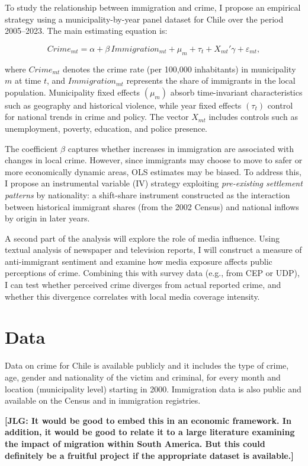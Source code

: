 To study the relationship between immigration and crime, I propose an empirical strategy using a municipality-by-year panel dataset for Chile over the period 2005--2023. The main estimating equation is:

\begin{equation}
	Crime_{mt} = \alpha + \beta \, Immigration_{mt} + \mu_m + \tau_t + X_{mt}'\gamma + \varepsilon_{mt},
\end{equation}

\noindent where $Crime_{mt}$ denotes the crime rate (per 100,000 inhabitants) in municipality $m$ at time $t$, and $Immigration_{mt}$ represents the share of immigrants in the local population. Municipality fixed effects $(\mu_m)$ absorb time-invariant characteristics such as geography and historical violence, while year fixed effects $(\tau_t)$ control for national trends in crime and policy. The vector $X_{mt}$ includes controls such as unemployment, poverty, education, and police presence.

The coefficient $\beta$ captures whether increases in immigration are associated with changes in local crime. However, since immigrants may choose to move to safer or more economically dynamic areas, OLS estimates may be biased. To address this, I propose an instrumental variable (IV) strategy exploiting \emph{pre-existing settlement patterns} by nationality: a shift-share instrument constructed as the interaction between historical immigrant shares (from the 2002 Census) and national inflows by origin in later years.

A second part of the analysis will explore the role of media influence. Using textual analysis of newspaper and television reports, I will construct a measure of anti-immigrant sentiment and examine how media exposure affects public perceptions of crime. Combining this with survey data (e.g., from CEP or UDP), I can test whether perceived crime diverges from actual reported crime, and whether this divergence correlates with local media coverage intensity.


\section{ Data}

Data on crime for Chile is available publicly and it includes the type of crime, age, gender and nationality of the victim and criminal, for every month and location (municipality level) starting in 2000. Immigration data is also public and available 
on the Census and in immigration registries.

\bigskip

\noindent \textbf{[JLG: It would be good to embed this in an economic framework. In addition, it would be good to relate it to a large literature examining the impact of migration within South America. But this could definitely be a fruitful project if the appropriate dataset is available.]}





